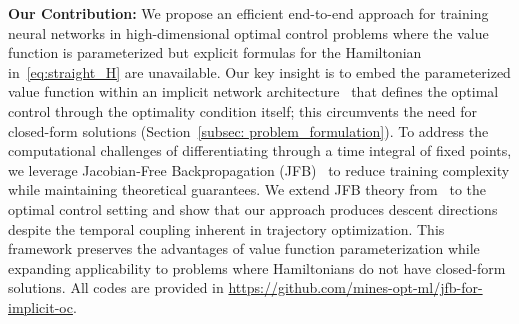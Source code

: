 \documentclass[letterpaper, 10 pt, conference]{ieeeconf}  %
\begin{document}
    \textbf{Our Contribution:} We propose an efficient end-to-end approach for training neural networks in high-dimensional optimal control problems where the value function is parameterized but explicit formulas for the Hamiltonian in~\eqref{eq:straight_H} are unavailable. 
    Our key insight is to embed the parameterized value function within an implicit network architecture~\cite{el2021implicit, bai2019deep, heaton2023explainable} that defines the optimal control through the optimality condition itself; this circumvents the need for closed-form solutions (Section~\ref{subsec: problem_formulation}).  To address the computational challenges of differentiating through a time integral of fixed points, we leverage Jacobian-Free Backpropagation (JFB)~\cite{fung2022jfb, bolte2024one, geng2021training} to reduce training complexity while maintaining theoretical guarantees. We extend JFB theory from~\cite{fung2022jfb} to the optimal control setting and show that our approach produces descent directions despite the temporal coupling inherent in trajectory optimization. This framework preserves the advantages of value function parameterization while expanding applicability to problems where Hamiltonians do not have closed-form solutions. All codes are provided in \url{https://github.com/mines-opt-ml/jfb-for-implicit-oc}.
\end{document}
